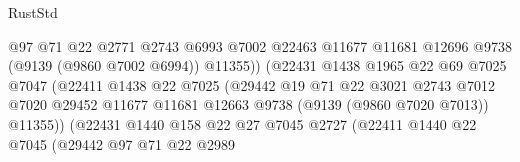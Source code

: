 \begin{lexlean}{RustStd}
\begin{coremodule}
                                        @97
                                        @71
                                        @22
                                        @2771
                                        @2743
                                        @6993
                                        @7002
                                        @22463
                                        @11677
                                        @11681
                                        @12696
                                        @9738
                                        (@9139 (@9860 @7002 @6994))
                                        @11355))
                                    (@22431
                                      @1438
                                      @1965
                                      @22
                                      @69
                                      @7025
                                      @7047
                                      (@22411
                                        @1438
                                        @22
                                        @7025
                                        (@29442
                                          @19
                                          @71
                                          @22
                                          @3021
                                          @2743
                                          @7012
                                          @7020
                                          @29452
                                          @11677
                                          @11681
                                          @12663
                                          @9738
                                          (@9139 (@9860 @7020 @7013))
                                          @11355))
                                      (@22431
                                        @1440
                                        @158
                                        @22
                                        @27
                                        @7045
                                        @2727
                                        (@22411
                                          @1440
                                          @22
                                          @7045
                                          (@29442
                                            @97
                                            @71
                                            @22
                                            @2989

\end{coremodule}
\end{lexlean}
